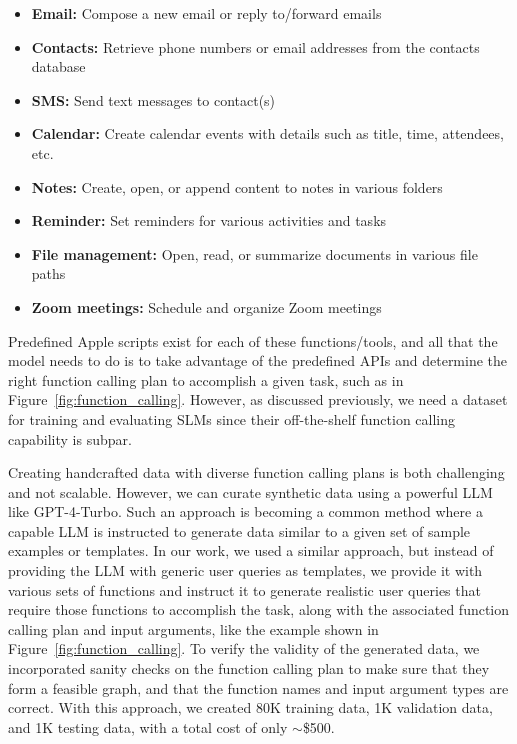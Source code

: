 \begin{itemize}[leftmargin=3mm]
    \item \textbf{Email:} Compose a new email or reply to/forward emails
    \vspace{-2.5mm}
    \item \textbf{Contacts:} Retrieve phone numbers or email addresses from the contacts database
        \vspace{-2.5mm}
    \item \textbf{SMS:} Send text messages to contact(s)
        \vspace{-2.5mm}
    \item \textbf{Calendar:} Create calendar events with details such as title, time, attendees, etc.
        \vspace{-2.5mm}
    \item \textbf{Notes:} Create, open, or append content to notes in various folders
        \vspace{-2.5mm}
    \item \textbf{Reminder:} Set reminders for various activities and tasks
        \vspace{-2.5mm}
    \item \textbf{File management:} Open, read, or summarize documents in various file paths
        \vspace{-2.5mm}
    \item \textbf{Zoom meetings:} Schedule and organize Zoom meetings
\end{itemize}


Predefined Apple scripts exist for each of these functions/tools, and all that the model needs to do is to take advantage of the predefined APIs and determine the right function calling plan to accomplish a given task, such as in Figure~\ref{fig:function_calling}. 
However, as discussed previously, we need a dataset for training and evaluating SLMs since their off-the-shelf function calling capability is subpar.

Creating handcrafted data with diverse function calling plans is both challenging and not scalable. However, we can curate synthetic data using a powerful LLM like GPT-4-Turbo. 
Such an approach is becoming a common method where a capable LLM is instructed to generate data similar to a given set of sample examples or templates.
In our work, we used a similar approach, but instead of providing the LLM with generic user queries as templates, we provide it with various sets of functions and instruct it to generate realistic user queries that require those functions to accomplish the task, along with the associated function calling plan and input arguments, like the example shown in Figure~\ref{fig:function_calling}. To verify the validity of the generated data, we incorporated sanity checks on the function calling plan to make sure that they form a feasible graph, and that the function names and input argument types are correct. With this approach, we created 80K training data, 1K validation data, and 1K testing data, with a total cost of only $\sim$\$500.

